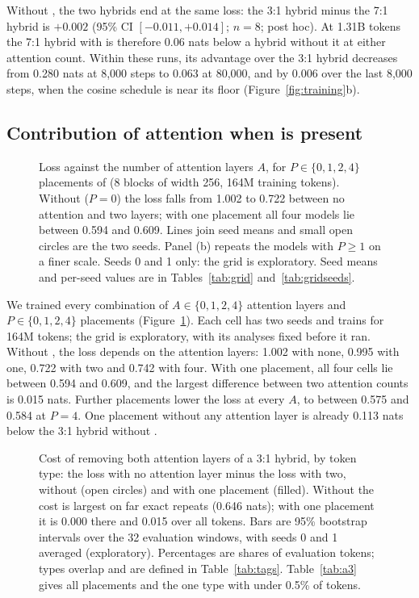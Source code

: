 Without \ingram{}, the two hybrids end at the same loss: the 3:1 hybrid minus the 7:1 hybrid is
$+0.002$ (95\% CI $[-0.011, +0.014]$; $n = 8$; post hoc). At 1.31B tokens the 7:1 hybrid with
\ingram{} is therefore 0.06 nats below a hybrid without it at either attention count. Within
these runs, its advantage over the 3:1 hybrid decreases from 0.280 nats at 8,000 steps to 0.063 at
80,000, and by 0.006 over the last 8,000 steps, when the cosine schedule is near its floor
(Figure~\ref{fig:training}b).

\subsection{Contribution of attention when \ingram{} is present}
\label{sec:types}

\begin{figure}[tb]
\centering

\caption{Loss against the number of attention layers $A$, for $P \in \{0, 1, 2, 4\}$ placements of
\ingram{} (8 blocks of width 256, 164M training tokens). Without \ingram{} ($P = 0$) the loss
falls from 1.002 to 0.722 between no attention and two layers; with one placement all four models
lie between 0.594 and 0.609. Lines join seed means and small open circles are the two seeds. Panel
(b) repeats the models with $P \ge 1$ on a finer scale. Seeds 0 and 1 only: the grid is
exploratory. Seed means and per-seed values are in Tables~\ref{tab:grid}
and~\ref{tab:gridseeds}.}
\label{fig:grid}
\end{figure}

We trained every combination of $A \in \{0, 1, 2, 4\}$ attention layers and $P \in \{0, 1, 2, 4\}$
placements (Figure~\ref{fig:grid}). Each cell has two seeds and trains for 164M tokens; the grid
is exploratory, with its analyses fixed before it ran. Without \ingram{}, the loss depends on the
attention layers: 1.002 with none, 0.995 with one, 0.722 with two and 0.742 with four. With one
placement, all four cells lie between 0.594 and 0.609, and the largest difference between two
attention counts is 0.015 nats. Further placements lower the loss at every $A$, to between 0.575
and 0.584 at $P = 4$. One placement without any attention layer is already 0.113 nats below the
3:1 hybrid without \ingram{}.

\begin{figure}[tb]
\centering

\caption{Cost of removing both attention layers of a 3:1 hybrid, by token type: the loss with no
attention layer minus the loss with two, without \ingram{} (open circles) and with one placement
(filled). Without \ingram{} the cost is largest on far exact repeats (0.646 nats); with one
placement it is 0.000 there and 0.015 over all tokens. Bars are 95\% bootstrap intervals over the
32 evaluation windows, with seeds 0 and 1 averaged (exploratory). Percentages are shares of
evaluation tokens; types overlap and are defined in Table~\ref{tab:tags}. Table~\ref{tab:a3} gives
all placements and the one type with under 0.5\% of tokens.}
\label{fig:types}
\end{figure}

